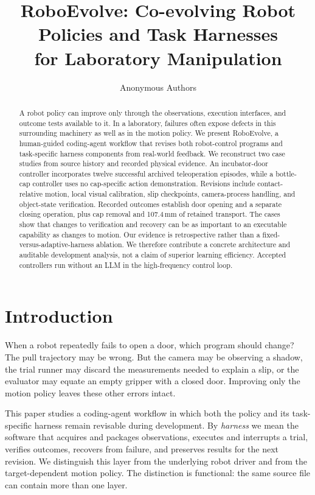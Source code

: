 
\title{RoboEvolve: Co-evolving Robot Policies and Task Harnesses\\for Laboratory Manipulation}
\author{Anonymous Authors}
\maketitle
\thispagestyle{empty}\pagestyle{empty}
\begin{abstract}
A robot policy can improve only through the observations, execution interfaces,
and outcome tests available to it. In a laboratory, failures often expose
defects in this surrounding machinery as well as in the motion policy. We
present RoboEvolve, a human-guided coding-agent workflow that revises both
robot-control programs and task-specific harness components from real-world
feedback. We reconstruct two case studies from source history and recorded
physical evidence. An incubator-door controller incorporates twelve successful
archived teleoperation episodes, while a bottle-cap controller uses no
cap-specific action demonstration. Revisions include contact-relative motion,
local visual calibration, slip checkpoints, camera-process handling, and
object-state verification. Recorded outcomes establish door opening and a
separate closing operation, plus cap removal and 107.4\,mm of retained
transport. The cases show that changes to verification and recovery can be as
important to an executable capability as changes to motion. Our evidence is
retrospective rather than a fixed-versus-adaptive-harness ablation. We therefore
contribute a concrete architecture and auditable development analysis, not a
claim of superior learning efficiency. Accepted controllers run without an
LLM in the high-frequency control loop.
\end{abstract}

\section{Introduction}
When a robot repeatedly fails to open a door, which program should change?
The pull trajectory may be wrong. But the camera may be observing a shadow,
the trial runner may discard the measurements needed to explain a slip, or
the evaluator may equate an empty gripper with a closed door. Improving only
the motion policy leaves these other errors intact.

This paper studies a coding-agent workflow in which both the policy and its
task-specific harness remain revisable during development. By \emph{harness}
we mean the software that acquires and packages observations, executes and
interrupts a trial, verifies outcomes, recovers from failure, and preserves
results for the next revision. We distinguish this layer from the underlying
robot driver and from the target-dependent motion policy. The distinction is
functional: the same source file can contain more than one layer.

